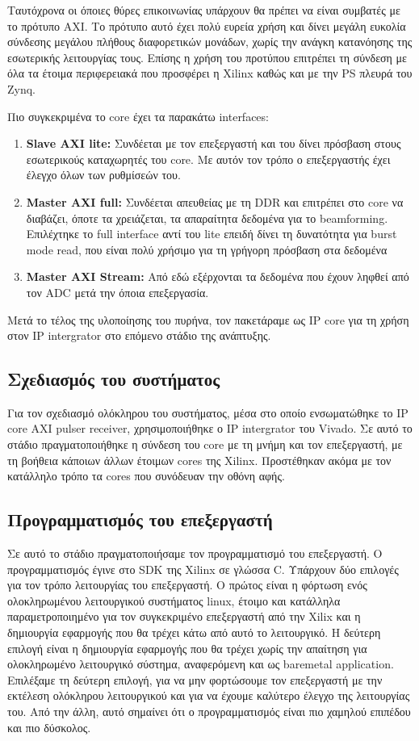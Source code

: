 \documentclass[12pt,a4paper]{book}
\begin{document}
Ταυτόχρονα οι όποιες θύρες επικοινωνίας υπάρχουν θα πρέπει να είναι συμβατές με το πρότυπο AXI. Το πρότυπο αυτό έχει πολύ ευρεία χρήση και δίνει μεγάλη ευκολία σύνδεσης μεγάλου πλήθους διαφορετικών μονάδων, χωρίς την ανάγκη κατανόησης της εσωτερικής λειτουργίας τους. Επίσης η χρήση του προτύπου επιτρέπει τη σύνδεση με όλα τα έτοιμα περιφερειακά που προσφέρει η Xilinx καθώς και με την PS πλευρά του Zynq.

Πιο συγκεκριμένα το core έχει τα παρακάτω interfaces:
\begin{enumerate}
\item \textbf{Slave AXI lite:} Συνδέεται με τον επεξεργαστή και του δίνει πρόσβαση στους εσωτερικούς καταχωρητές του core. Με αυτόν τον τρόπο ο επεξεργαστής έχει έλεγχο όλων των ρυθμίσεών του.
\item \textbf{Master AXI full:} Συνδέεται απευθείας με τη DDR και επιτρέπει στο core να διαβάζει, όποτε τα χρειάζεται, τα απαραίτητα δεδομένα για το beamforming. Επιλέχτηκε το full interface αντί του lite επειδή δίνει τη δυνατότητα για burst mode read, που είναι πολύ χρήσιμο για τη γρήγορη πρόσβαση στα δεδομένα
\item\textbf{Master AXI Stream:} Από εδώ εξέρχονται τα δεδομένα που έχουν ληφθεί από τον ADC μετά την όποια επεξεργασία. 
\end{enumerate}

Μετά το τέλος της υλοποίησης του πυρήνα, τον πακετάραμε ως IP core για τη χρήση στον IP intergrator στο επόμενο στάδιο της ανάπτυξης.


\subsection{Σχεδιασμός του συστήματος}
Για τον σχεδιασμό ολόκληρου του συστήματος, μέσα στο οποίο ενσωματώθηκε το IP core AXI pulser receiver, χρησιμοποιήθηκε ο IP intergrator του Vivado. Σε αυτό το στάδιο πραγματοποιήθηκε η σύνδεση του core με τη μνήμη και τον επεξεργαστή, με τη βοήθεια κάποιων άλλων έτοιμων cores της Xilinx. Προστέθηκαν ακόμα με τον κατάλληλο τρόπο τα cores που συνόδευαν την οθόνη αφής.

\subsection{Προγραμματισμός του επεξεργαστή}
Σε αυτό το στάδιο πραγματοποιήσαμε τον προγραμματισμό του επεξεργαστή. Ο προγραμματισμός έγινε στο SDK της Xilinx σε γλώσσα C. Υπάρχουν δύο επιλογές για τον τρόπο λειτουργίας του επεξεργαστή. Ο πρώτος είναι η φόρτωση ενός ολοκληρωμένου λειτουργικού συστήματος linux, έτοιμο και κατάλληλα παραμετροποιημένο για τον συγκεκριμένο επεξεργαστή από την Xilix και η δημιουργία εφαρμογής που θα τρέχει κάτω από αυτό το λειτουργικό. Η δεύτερη επιλογή είναι η δημιουργία εφαρμογής που θα τρέχει χωρίς την απαίτηση για ολοκληρωμένο λειτουργικό σύστημα, αναφερόμενη και ως baremetal application. Επιλέξαμε τη δεύτερη επιλογή, για να μην φορτώσουμε τον επεξεργαστή με την εκτέλεση ολόκληρου λειτουργικού και για να έχουμε καλύτερο έλεγχο της λειτουργίας του. Από την άλλη, αυτό σημαίνει ότι ο προγραμματισμός είναι πιο χαμηλού επιπέδου και πιο δύσκολος. 
\end{document}
